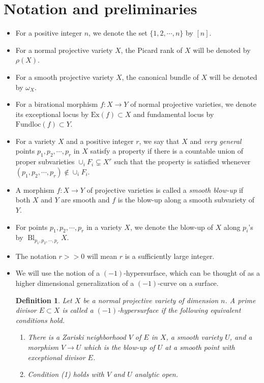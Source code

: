 \documentclass[11pt,letterpaper]{amsart}
\newtheorem{definition}[lemma]{Definition}
\begin{document}
\section{Notation and preliminaries}
\begin{itemize}
\item For a positive integer $n$, we denote the set $\{1,2,\cdots,n\}$ by $[n]$.
\item For a normal projective variety $X$, the Picard rank of $X$ will be denoted by $\rho(X).$
\item For a smooth projective variety $X$, the canonical bundle of $X$ will be denoted by $\omega_X.$
\item For a birational morphism $f:X\to Y$ of normal projective varieties, we denote its exceptional locus by $\text{Ex}(f)\subset X$ and fundamental locus by $\text{Fundloc}(f)\subset Y.$
\item For a variety $X$ and a positive integer $r$, we say that $X$ and \textit{very general} points $p_1, p_2,\cdots ,p_r$ in $X$ satisfy a property if there is a countable union of proper subvarieties $\cup_iF_i\subsetneq X^r$ such that the property is satisfied whenever $(p_1,p_2,\cdots, p_r)\not\in \cup_iF_i$.
\item A morphism $f:X\to Y$ of projective varieties is called a \textit{smooth blow-up} if both $X$ and $Y$ are smooth and $f$ is the blow-up along a smooth subvariety of $Y$.
\item For points $p_1,p_2,\cdots,p_r$ in a variety $X$, we denote the blow-up of $X$ along $p_i$'s by $\operatorname{Bl}_{p_1,p_2,\cdots,p_r}X$.
\item The notation $r>>0$ will mean $r$ is a sufficiently large integer.
    \item We will use the notion of a $(-1)$-hypersurface, which can be thought of as a higher dimensional generalization of a $(-1)$-curve on a surface.
    \begin{definition}\label{-1 hypersurface}
Let $X$ be a normal projective variety of dimension $n$. A prime divisor
$E\subset X$ is called a $(-1)$-hypersurface if the following equivalent
conditions hold.

\begin{enumerate}
\item There is a Zariski neighborhood $V$ of $E$ in $X$, a smooth variety
$U$, and a morphism $V\to U$ which is the blow-up of $U$ at a smooth point
with exceptional divisor $E$.

\item Condition (1) holds with $V$ and $U$ analytic open.


\end{enumerate}
\end{definition}
\end{itemize}
\end{document}
